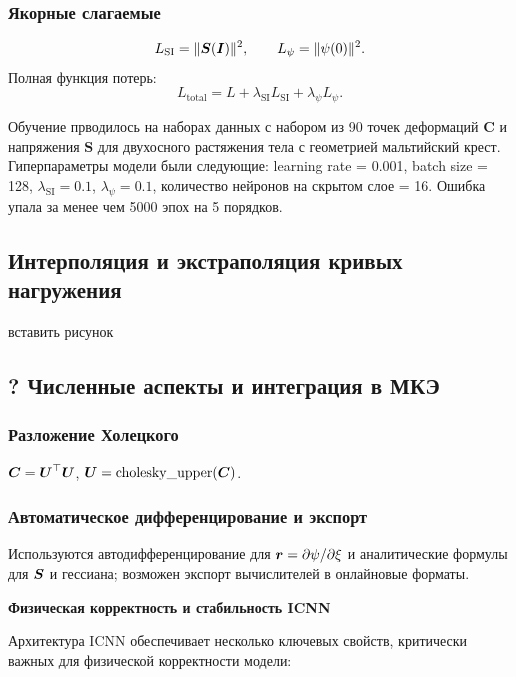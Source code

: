 \subsubsection{Якорные слагаемые}
\begin{equation}
 L_{\text{SI}} = \lVert \boldsymbol{S}(\boldsymbol{I})\rVert^2,\qquad L_{\psi}=\lVert\psi(0)\rVert^2.
\end{equation}
Полная функция потерь:
\begin{equation}
 L_{\text{total}} = L + \lambda_{\text{SI}} L_{\text{SI}} + \lambda_{\psi} L_{\psi}.
\end{equation}

Обучение прводилось на наборах данных с набором из 90 точек деформаций \(\mathbf{C}\) и напряжения \(\mathbf{S}\)
для двухосного растяжения тела с геометрией мальтийский крест. 
Гиперпараметры модели были следующие: learning rate = 0.001, batch size = 128, \(\lambda_{\text{SI}} = 0.1\), \(\lambda_{\psi} = 0.1\), количество нейронов на скрытом слое = 16.
Ошибка упала за менее чем 5000 эпох на 5 порядков.

\subsection{Интерполяция и экстраполяция кривых нагружения}
  вставить рисунок

\subsection{? Численные аспекты и интеграция в МКЭ}
\subsubsection{Разложение Холецкого}
\(\boldsymbol{C} = \boldsymbol{U}^{\top}\boldsymbol{U}\), \; \(\boldsymbol{U}=\operatorname{cholesky\_upper}(\boldsymbol{C})\).

\subsubsection{Автоматическое дифференцирование и экспорт}
Используются автодифференцирование для \(\boldsymbol{r}=\partial\psi/\partial\xi\) и аналитические формулы для \(\boldsymbol{S}\) и гессиана; возможен экспорт вычислителей в онлайновые форматы.

\textbf{Физическая корректность и стабильность ICNN}

Архитектура ICNN обеспечивает несколько ключевых свойств, критически важных для физической корректности модели:

